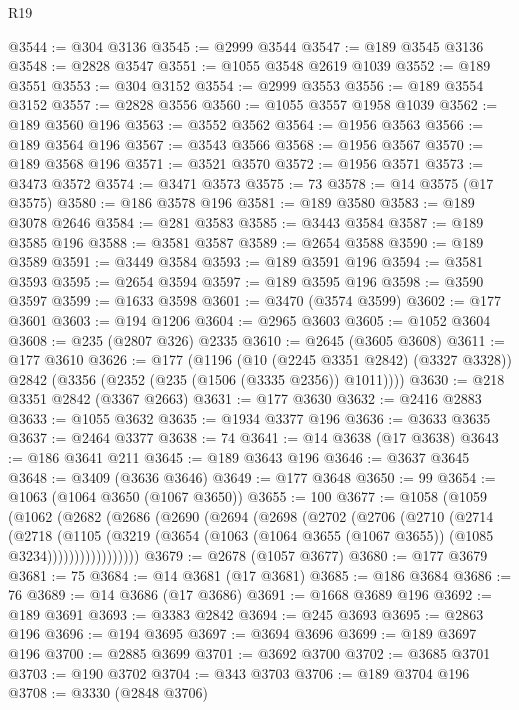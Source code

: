 \begin{lexlean}{R19}
\begin{coremodule}
@3544 := @304 @3136
@3545 := @2999 @3544
@3547 := @189 @3545 @3136
@3548 := @2828 @3547
@3551 := @1055 @3548 @2619 @1039
@3552 := @189 @3551
@3553 := @304 @3152
@3554 := @2999 @3553
@3556 := @189 @3554 @3152
@3557 := @2828 @3556
@3560 := @1055 @3557 @1958 @1039
@3562 := @189 @3560 @196
@3563 := @3552 @3562
@3564 := @1956 @3563
@3566 := @189 @3564 @196
@3567 := @3543 @3566
@3568 := @1956 @3567
@3570 := @189 @3568 @196
@3571 := @3521 @3570
@3572 := @1956 @3571
@3573 := @3473 @3572
@3574 := @3471 @3573
@3575 := 73
@3578 := @14 @3575 (@17 @3575)
@3580 := @186 @3578 @196
@3581 := @189 @3580
@3583 := @189 @3078 @2646
@3584 := @281 @3583
@3585 := @3443 @3584
@3587 := @189 @3585 @196
@3588 := @3581 @3587
@3589 := @2654 @3588
@3590 := @189 @3589
@3591 := @3449 @3584
@3593 := @189 @3591 @196
@3594 := @3581 @3593
@3595 := @2654 @3594
@3597 := @189 @3595 @196
@3598 := @3590 @3597
@3599 := @1633 @3598
@3601 := @3470 (@3574 @3599)
@3602 := @177 @3601
@3603 := @194 @1206
@3604 := @2965 @3603
@3605 := @1052 @3604
@3608 := @235 (@2807 @326) @2335
@3610 := @2645 (@3605 @3608)
@3611 := @177 @3610
@3626 := @177
    (@1196
      (@10 (@2245 @3351 @2842) (@3327 @3328))
      @2842
      (@3356 (@2352 (@235 (@1506 (@3335 @2356)) @1011))))
@3630 := @218 @3351 @2842 (@3367 @2663)
@3631 := @177 @3630
@3632 := @2416 @2883
@3633 := @1055 @3632
@3635 := @1934 @3377 @196
@3636 := @3633 @3635
@3637 := @2464 @3377
@3638 := 74
@3641 := @14 @3638 (@17 @3638)
@3643 := @186 @3641 @211
@3645 := @189 @3643 @196
@3646 := @3637 @3645
@3648 := @3409 (@3636 @3646)
@3649 := @177 @3648
@3650 := 99
@3654 := @1063 (@1064 @3650 (@1067 @3650))
@3655 := 100
@3677 := @1058
    (@1059
      (@1062
        (@2682
          (@2686
            (@2690
              (@2694
                (@2698
                  (@2702
                    (@2706
                      (@2710
                        (@2714
                          (@2718
                            (@1105
                              (@3219
                                (@3654
                                  (@1063 (@1064 @3655 (@1067 @3655)) (@1085 @3234)))))))))))))))))
@3679 := @2678 (@1057 @3677)
@3680 := @177 @3679
@3681 := 75
@3684 := @14 @3681 (@17 @3681)
@3685 := @186 @3684
@3686 := 76
@3689 := @14 @3686 (@17 @3686)
@3691 := @1668 @3689 @196
@3692 := @189 @3691
@3693 := @3383 @2842
@3694 := @245 @3693
@3695 := @2863 @196
@3696 := @194 @3695
@3697 := @3694 @3696
@3699 := @189 @3697 @196
@3700 := @2885 @3699
@3701 := @3692 @3700
@3702 := @3685 @3701
@3703 := @190 @3702
@3704 := @343 @3703
@3706 := @189 @3704 @196
@3708 := @3330 (@2848 @3706)

\end{coremodule}
\end{lexlean}
